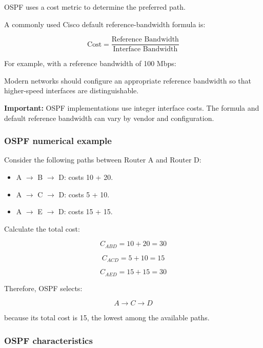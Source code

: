 OSPF uses a cost metric to determine the preferred path.

A commonly used Cisco default reference-bandwidth formula is:



\[
\text{Cost}=\frac{\text{Reference Bandwidth}}{\text{Interface Bandwidth}}
\]



For example, with a reference bandwidth of 100 Mbps:


Modern networks should configure an appropriate reference bandwidth so that higher-speed interfaces are distinguishable.

\textbf{Important:} OSPF implementations use integer interface costs. The formula and default reference bandwidth can vary by vendor and configuration.

\subsubsection{OSPF numerical example}

Consider the following paths between Router A and Router D:

\begin{itemize}
\item A $\to$ B $\to$ D: costs 10 + 20.
\item A $\to$ C $\to$ D: costs 5 + 10.
\item A $\to$ E $\to$ D: costs 15 + 15.
\end{itemize}

Calculate the total cost:



\[
C_{ABD}=10+20=30
\]





\[
C_{ACD}=5+10=15
\]





\[
C_{AED}=15+15=30
\]



Therefore, OSPF selects:



\[
\boxed{A\rightarrow C\rightarrow D}
\]



because its total cost is 15, the lowest among the available paths.

\subsubsection{OSPF characteristics}

